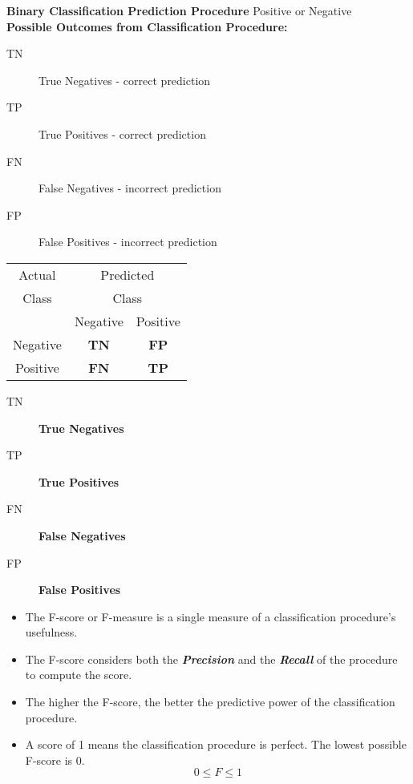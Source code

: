\documentclass{article}
\begin{document}
	
	
	

	\textbf{Binary Classification Prediction Procedure} Positive or Negative \\ \bigskip
	\textbf{Possible Outcomes from Classification Procedure:}\\ \bigskip
	\begin{description}
		\item[TN] True Negatives - correct prediction
		\item[TP] True Positives - correct prediction
		\item[FN] False Negatives - incorrect prediction
		\item[FP] False Positives - incorrect prediction
	\end{description}
	
	
	
	
	
	
	{

		\centering
		\begin{table}[!htbp]
			
			\begin{tabular}{c | *2c }
				Actual  & \multicolumn{2}{c}{Predicted}\\
				Class  & \multicolumn{2}{c}{Class}\\
				\midrule
				{}   & Negative & Positive       \\
				Negative  &  \textbf{TN} & \textbf{FP}  \\
				Positive   &  \textbf{FN} & \textbf{TP}  \\
			\end{tabular}
		\end{table}
	}
	\begin{description}
		\item[TN] \textbf{True Negatives} 
		\item[TP] \textbf{True Positives} 
		\item[FN] \textbf{False Negatives}
		\item[FP] \textbf{False Positives} 
	\end{description}
	
	

	\begin{itemize}
		\item The F-score or F-measure is a single measure of a classification procedure's usefulness. 
		\item The F-score considers both the \textit{\textbf{Precision}} and the \textit{\textbf{Recall}} of the procedure to compute the score.
		\item The higher the F-score, the better the predictive power of the 
		classification procedure. 
		\item A score of 1 means the classification procedure is perfect. The lowest possible F-score is 0.
		\[ 0 \leq F \leq 1 \]
	\end{itemize}
	
\end{document}
